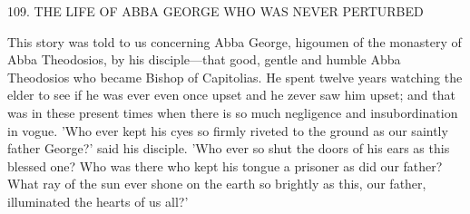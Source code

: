 109. THE LIFE OF ABBA GEORGE
WHO WAS NEVER PERTURBED

This story was told to us concerning Abba George, higoumen of the
monastery of Abba Theodosios, by his disciple—that good, gentle
and humble Abba Theodosios who became Bishop of Capitolias. He
spent twelve years watching the elder to see if he was ever even once
upset and he zever saw him upset; and that was in these present
times when there is so much negligence and insubordination in
vogue. 'Who ever kept his cyes so firmly riveted to the ground as
our saintly father George?' said his disciple. 'Who ever so shut the
doors of his ears as this blessed one? Who was there who kept his
tongue a prisoner as did our father? What ray of the sun ever shone
on the earth so brightly as this, our father, illuminated the hearts of
us all?'


